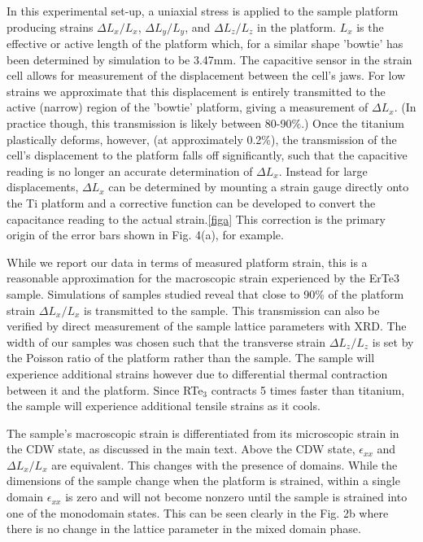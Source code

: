 \documentclass[%
 reprint, %
amsmath,amssymb,
aps,
]{revtex4-2}
\begin{document}
In this experimental set-up, a uniaxial stress is applied to the sample platform producing strains $\Delta L_x/L_x$, $\Delta L_y/L_y$, and $\Delta L_z/L_z$ in the platform. $L_x$ is the effective or active length of the platform which, for a similar shape 'bowtie' has been determined by simulation to be 3.47mm.\cite{Park2020} The capacitive sensor in the strain cell allows for measurement of the displacement between the cell's jaws. For low strains we approximate that this displacement is entirely transmitted to the active (narrow) region of the 'bowtie' platform, giving a measurement of $\Delta L_x$. (In practice though, this transmission is likely between 80-90$\%$.) Once the titanium  plastically deforms, however, (at approximately 0.2$\%$), the transmission of the cell's displacement to the platform falls off significantly, such that the capacitive reading is no longer an accurate determination of $\Delta L_x$. Instead for large displacements, $\Delta L_x$ can be determined by mounting a strain gauge directly onto the Ti platform and a corrective function can be developed to convert the capacitance reading to the actual strain.\ref{figa} This correction is the primary origin of the error bars shown in Fig. 4(a), for example.

While we report our data in terms of measured platform strain, this is a reasonable approximation for the macroscopic strain experienced by the ErTe$3$ sample. Simulations of samples studied reveal that close to 90$\%$ of the platform strain $\Delta L_x/L_x$ is transmitted to the sample. This transmission can also be verified by direct measurement of the sample lattice parameters with XRD. The width of our samples was chosen such that the transverse strain $\Delta L_z/L_z$ is set by the Poisson ratio of the platform rather than the sample. The sample will experience additional strains however due to differential thermal contraction between it and the platform. Since RTe$_3$ contracts 5 times faster than titanium, the sample will experience additional tensile strains as it cools.

The sample's macroscopic strain is differentiated from its microscopic strain in the CDW state, as discussed in the main text. Above the CDW state, $\epsilon_{xx}$ and $\Delta L_x/L_x$ are equivalent. This changes with the presence of domains. While the dimensions of the sample change when the platform is strained, within a single domain $\epsilon_{xx}$ is zero and will not become nonzero until the sample is strained into one of the monodomain states. This can be seen clearly in the Fig. 2b where there is no change in the lattice parameter in the mixed domain phase. 
\end{document}

